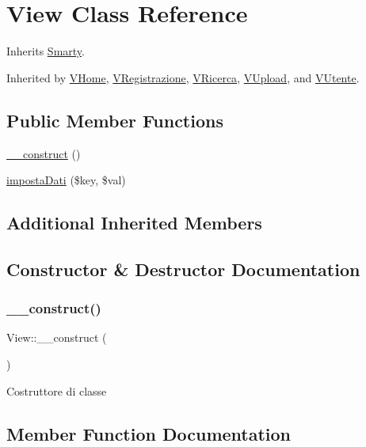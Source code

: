 \hypertarget{class_view}{}\section{View Class Reference}
\label{class_view}


Inherits \mbox{\hyperlink{class_smarty}{Smarty}}.



Inherited by \mbox{\hyperlink{class_v_home}{V\+Home}}, \mbox{\hyperlink{class_v_registrazione}{V\+Registrazione}}, \mbox{\hyperlink{class_v_ricerca}{V\+Ricerca}}, \mbox{\hyperlink{class_v_upload}{V\+Upload}}, and \mbox{\hyperlink{class_v_utente}{V\+Utente}}.

\subsection*{Public Member Functions}
\begin{DoxyCompactItemize}
\item 
\mbox{\hyperlink{class_view_aa9573525dcc8de4c463a1e7587ab7c5a}{\+\_\+\+\_\+construct}} ()
\item 
\mbox{\hyperlink{class_view_af9fd6b248a5a2baefff04116e90e50ac}{imposta\+Dati}} (\$key, \$val)
\end{DoxyCompactItemize}
\subsection*{Additional Inherited Members}


\subsection{Constructor \& Destructor Documentation}
\mbox{\label{class_view_aa9573525dcc8de4c463a1e7587ab7c5a}} 
\subsubsection{\texorpdfstring{\+\_\+\+\_\+construct()}{\_\_construct()}}
{\footnotesize\ttfamily View\+::\+\_\+\+\_\+construct (\begin{DoxyParamCaption}{ }\end{DoxyParamCaption})}

Costruttore di classe 

\subsection{Member Function Documentation}
\mbox{\label{class_view_af9fd6b248a5a2baefff04116e90e50ac}} 
